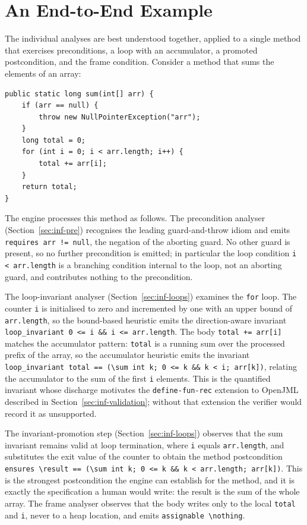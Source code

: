 \section{An End-to-End Example}
\label{sec:inf-example}

The individual analyses are best understood together, applied to a single method
that exercises preconditions, a loop with an accumulator, a promoted
postcondition, and the frame condition. Consider a method that sums the elements
of an array:

\begin{lstlisting}
public static long sum(int[] arr) {
    if (arr == null) {
        throw new NullPointerException("arr");
    }
    long total = 0;
    for (int i = 0; i < arr.length; i++) {
        total += arr[i];
    }
    return total;
}
\end{lstlisting}

The engine processes this method as follows. The precondition analyser
(Section~\ref{sec:inf-pre}) recognises the leading guard-and-throw idiom and
emits \texttt{requires arr != null}, the negation of the aborting guard. No
other guard is present, so no further precondition is emitted; in particular the
loop condition \texttt{i < arr.length} is a branching condition internal to the
loop, not an aborting guard, and contributes nothing to the precondition.

The loop-invariant analyser (Section~\ref{sec:inf-loops}) examines the
\texttt{for} loop. The counter \texttt{i} is initialised to zero and incremented
by one with an upper bound of \texttt{arr.length}, so the bound-based heuristic
emits the direction-aware invariant \texttt{loop\_invariant 0 <= i \&\& i <= arr.length}.
The body \texttt{total += arr[i]} matches the accumulator pattern: \texttt{total}
is a running sum over the processed prefix of the array, so the accumulator
heuristic emits the invariant
\texttt{loop\_invariant total == (\textbackslash sum int k; 0 <= k \&\& k < i; arr[k])},
relating the accumulator to the sum of the first \texttt{i} elements. This is the
quantified invariant whose discharge motivates the \texttt{define-fun-rec}
extension to OpenJML described in Section~\ref{sec:inf-validation}; without that
extension the verifier would record it as unsupported.

The invariant-promotion step (Section~\ref{sec:inf-loops}) observes that the sum
invariant remains valid at loop termination, where \texttt{i} equals
\texttt{arr.length}, and substitutes the exit value of the counter to obtain the
method postcondition
\texttt{ensures \textbackslash result == (\textbackslash sum int k; 0 <= k \&\& k < arr.length; arr[k])}.
This is the strongest postcondition the engine can establish for the method, and
it is exactly the specification a human would write: the result is the sum of the
whole array. The frame analyser observes that the body writes only to the local
\texttt{total} and \texttt{i}, never to a heap location, and emits
\texttt{assignable \textbackslash nothing}.


